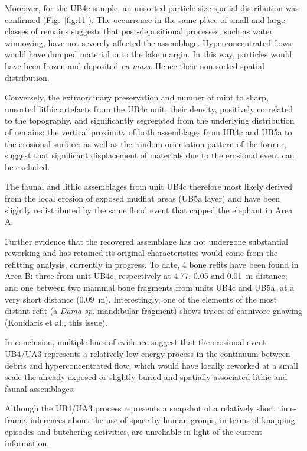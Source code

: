 \documentclass[preprint,authoryear,times]{elsarticle} %
\begin{document}
Moreover, for the UB4c sample, an unsorted particle size spatial distribution was confirmed (Fig.~\ref{fig:11}). The occurrence in the same place of small and large classes of remains suggests that post-depositional processes, such as water winnowing, have not severely affected the assemblage. Hyperconcentrated flows would have dumped material onto the lake margin. In this way, particles would have been frozen and deposited \emph{en mass}. Hence their non-sorted spatial distribution.

Conversely, the extraordinary preservation and number of mint to sharp, unsorted lithic artefacts from the UB4c unit; their density, positively correlated to the topography, and significantly segregated from the underlying distribution of remains; the vertical proximity of both assemblages from UB4c and UB5a to the erosional surface; as well as the random orientation pattern of the former, suggest that significant displacement of materials due to the erosional event can be excluded.

The faunal and lithic assemblages from unit UB4c therefore most likely derived from the local erosion of exposed mudflat areas (UB5a layer) and have been slightly redistributed by the same flood event that capped the elephant in Area A.

Further evidence that the recovered assemblage has not undergone substantial reworking and has retained its original characteristics would come from the refitting analysis, currently in progress. To date, 4 bone refits have been found in Area B: three from unit UB4c, respectively at 4.77, 0.05 and 0.01~m distance; and one between two mammal bone fragments from units UB4c and UB5a, at a very short distance (0.09~m). Interestingly, one of the elements of the most distant refit (a \emph{Dama sp.} mandibular fragment) shows traces of carnivore gnawing (Konidaris et al., this issue).

In conclusion, multiple lines of evidence suggest that the erosional event UB4/UA3 represents a relatively low-energy process in the continuum between debris and hyperconcentrated flow, which would have locally reworked at a small scale the already exposed or slightly buried and spatially associated lithic and faunal assemblages.

Although the UB4/UA3 process represents a snapshot of a relatively short time-frame, inferences about the use of space by human groups, in terms of knapping episodes and butchering activities, are unreliable in light of the current information.
\end{document}
